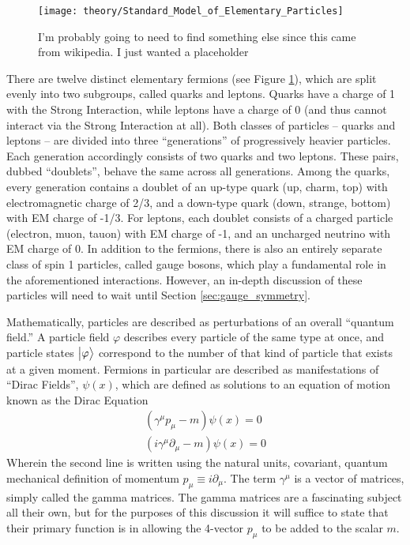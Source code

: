     \begin{figure}[h!]
        \texttt{[image: theory/Standard\_Model\_of\_Elementary\_Particles]}
        \caption{I'm probably going to need to find something else since this came from wikipedia. I just wanted a placeholder}
        \label{fig:sm_particles}
    \end{figure}

    There are twelve distinct elementary fermions (see Figure \ref{fig:sm_particles}),
        which are split evenly into two subgroups, called quarks and leptons.
    Quarks have a charge of 1 with the Strong Interaction,
        while leptons have a charge of 0 (and thus cannot interact via the Strong Interaction at all).
    Both classes of particles -- quarks and leptons -- are divided into three ``generations'' of progressively heavier particles.
    Each generation accordingly consists of two quarks and two leptons.
    These pairs, dubbed ``doublets'', behave the same across all generations.
    Among the quarks, every generation contains a doublet of an up-type quark (up, charm, top) with electromagnetic charge of 2/3,
        and a down-type quark (down, strange, bottom) with EM charge of -1/3.
    For leptons, each doublet consists of a charged particle (electron, muon, tauon) with EM charge of -1,
        and an uncharged neutrino with EM charge of 0.
    In addition to the fermions, there is also an entirely separate class of spin 1 particles, called gauge bosons,
        which play a fundamental role in the aforementioned interactions.
    However, an in-depth discussion of these particles will need to wait until Section \ref{sec:gauge_symmetry}.

    Mathematically, particles are described as perturbations of an overall ``quantum field.''
    A particle field $\varphi$ describes every particle of the same type at once,
        and particle states $\big| \varphi \big>$ correspond to the number of that kind of particle that exists at a given moment.
    Fermions in particular are described as manifestations of ``Dirac Fields'', $\psi(x)$,
        which are defined as solutions to an equation of motion known as the Dirac Equation
    \begin{equation} \begin{split}
        (\gamma^\mu p_\mu - m) \psi(x) = 0
        \\ (i\gamma^\mu \partial_\mu - m) \psi(x) = 0
    \end{split} \end{equation}
    Wherein the second line is written using the natural units, covariant,
        quantum mechanical definition of momentum $p_\mu \equiv i\partial_\mu$.
    The term $\gamma^\mu$ is a vector of matrices, simply called the gamma matrices.
    The gamma matrices are a fascinating subject all their own, 
        but for the purposes of this discussion it will suffice to state that
        their primary function is in allowing the 4-vector $p_\mu$ to be added to the scalar $m$.


